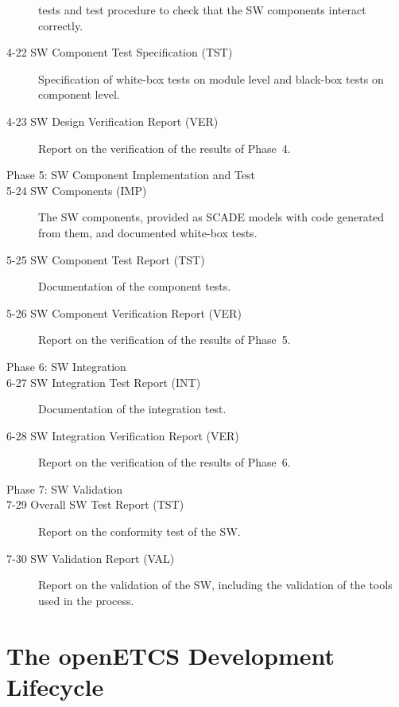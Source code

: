 \documentclass{template/openetcs_article}
\begin{document}
\begin{description}
  tests and test procedure to check that the SW components interact
  correctly.
\item[4-22 SW Component Test Specification (TST)] Specification of
  white-box tests on module level and black-box tests on component level.
\item[4-23 SW Design Verification Report (VER)] Report on the
  verification of the results of Phase~4.
\item[Phase 5: SW Component Implementation and Test] 
\item[5-24 SW Components (IMP)] The SW components, provided as SCADE models
  with code generated from them, and documented white-box tests.
\item[5-25 SW Component Test Report (TST)] Documentation of the component tests. 
\item[5-26 SW Component Verification Report (VER)] Report on the
  verification of the results of Phase~5.
\item[Phase 6: SW Integration] 
\item[6-27 SW Integration Test Report (INT)] Documentation of the
  integration test. 
\item[6-28 SW Integration Verification Report (VER)] Report on the
  verification of the results of Phase~6.
\item[Phase 7: SW Validation] 
\item[7-29 Overall SW Test Report (TST)] Report on the conformity test of
  the SW.
\item[7-30 SW Validation Report (VAL)] Report on the validation of the
  SW, including the validation of the tools used in the process.
\end{description}




\section{The openETCS Development Lifecycle}
\label{sec:devel-lifecycle}


\end{document}
